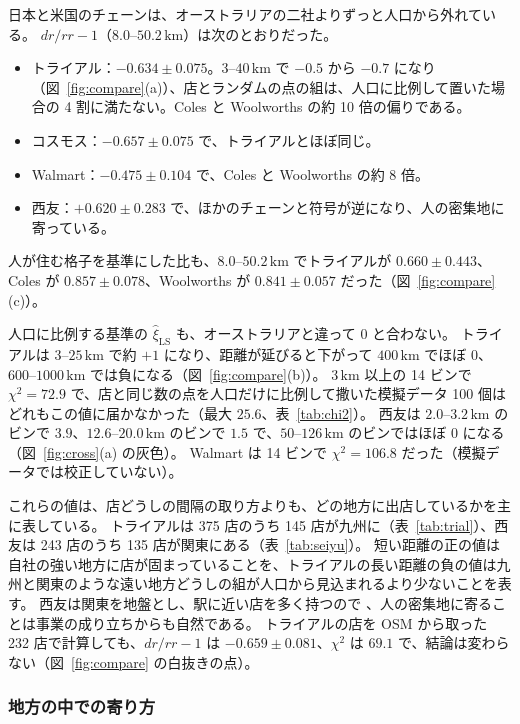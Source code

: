 \documentclass[a4paper,11pt]{ltjsarticle}
\begin{document}
日本と米国のチェーンは、オーストラリアの二社よりずっと人口から外れている。
$dr/rr - 1$（$8.0$--$50.2\,\mathrm{km}$）は次のとおりだった。
\begin{itemize}
  \item トライアル：$-0.634 \pm 0.075$。$3$--$40\,\mathrm{km}$ で $-0.5$ から $-0.7$ になり（図~\ref{fig:compare}(a)）、店とランダムの点の組は、人口に比例して置いた場合の 4 割に満たない。Coles と Woolworths の約 10 倍の偏りである。
  \item コスモス：$-0.657 \pm 0.075$ で、トライアルとほぼ同じ。
  \item Walmart：$-0.475 \pm 0.104$ で、Coles と Woolworths の約 8 倍。
  \item 西友：$+0.620 \pm 0.283$ で、ほかのチェーンと符号が逆になり、人の密集地に寄っている。
\end{itemize}
人が住む格子を基準にした比も、$8.0$--$50.2\,\mathrm{km}$ でトライアルが $0.660 \pm 0.443$、Coles が $0.857 \pm 0.078$、Woolworths が $0.841 \pm 0.057$ だった（図~\ref{fig:compare}(c)）。

人口に比例する基準の $\hat\xi_{\mathrm{LS}}$ も、オーストラリアと違って $0$ と合わない。
トライアルは $3$--$25\,\mathrm{km}$ で約 $+1$ になり、距離が延びると下がって $400\,\mathrm{km}$ でほぼ $0$、$600$--$1000\,\mathrm{km}$ では負になる（図~\ref{fig:compare}(b)）。
$3\,\mathrm{km}$ 以上の 14 ビンで $\chi^2 = 72.9$ で、店と同じ数の点を人口だけに比例して撒いた模擬データ 100 個はどれもこの値に届かなかった（最大 $25.6$、表~\ref{tab:chi2}）。
西友は $2.0$--$3.2\,\mathrm{km}$ のビンで $3.9$、$12.6$--$20.0\,\mathrm{km}$ のビンで $1.5$ で、$50$--$126\,\mathrm{km}$ のビンではほぼ $0$ になる（図~\ref{fig:cross}(a) の灰色）。
Walmart は 14 ビンで $\chi^2 = 106.8$ だった（模擬データでは校正していない）。

これらの値は、店どうしの間隔の取り方よりも、どの地方に出店しているかを主に表している。
トライアルは 375 店のうち 145 店が九州に（表~\ref{tab:trial}）、西友は 243 店のうち 135 店が関東にある（表~\ref{tab:seiyu}）。
短い距離の正の値は自社の強い地方に店が固まっていることを、トライアルの長い距離の負の値は九州と関東のような遠い地方どうしの組が人口から見込まれるより少ないことを表す。
西友は関東を地盤とし、駅に近い店を多く持つので \cite{NetshopSeiyu2025}、人の密集地に寄ることは事業の成り立ちからも自然である。
トライアルの店を OSM から取った 232 店で計算しても、$dr/rr - 1$ は $-0.659 \pm 0.081$、$\chi^2$ は $69.1$ で、結論は変わらない（図~\ref{fig:compare} の白抜きの点）。

\subsubsection{地方の中での寄り方}
\end{document}

